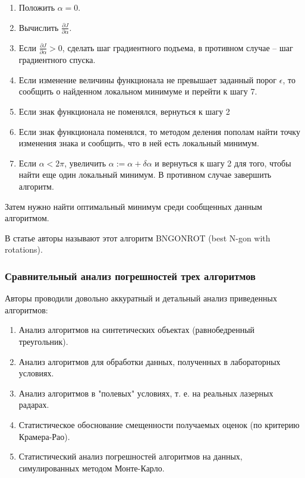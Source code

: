 \documentclass[a4paper, 12pt, titlepage]{article}
\theoremstyle{definition}
\theoremstyle{plain}
\theoremstyle{plain}
\begin{document}
\begin{enumerate}
 \item Положить $\alpha = 0$.
 \item Вычислить $\frac{\partial J}{\partial \alpha}$.
 \item Если $\frac{\partial J}{\partial \alpha} > 0$, сделать шаг градиентного 
подъема, в противном случае -- шаг градиентного спуска.
 \item Если изменение величины функционала не превышает заданный порог
$\epsilon$, то сообщить о найденном локальном минимуме и перейти к шагу 7.
 \item Если знак функционала не поменялся, вернуться к шагу 2
 \item Если знак функционала поменялся, то методом деления пополам найти точку 
изменения знака и сообщить, что в ней есть локальный минимум.
 \item Если $\alpha < 2 \pi$, увеличить $\alpha := \alpha + \delta \alpha$ и
вернуться к шагу 2 для того, чтобы найти еще один локальный минимум. В противном
случае завершить алгоритм.
\end{enumerate}

Затем нужно найти оптимальный минимум среди сообщенных данным алгоритмом.

В статье авторы называют этот алгоритм BNGONROT (best N-gon with rotations).

\subsubsection{Сравнительный анализ погрешностей трех алгоритмов}
\label{sec:history/LeleKW92/analysis}

Авторы проводили довольно аккуратный и детальный анализ приведенных алгоритмов:

\begin{enumerate}
 \item Анализ алгоритмов на синтетических объектах (равнобедренный треугольник).
 \item Анализ алгоритмов для обработки данных, полученных в лабораторных
условиях.
 \item Анализ алгоритмов в "полевых" условиях, т. е. на реальных лазерных
радарах.
 \item Статистическое обоснование смещенности получаемых оценок (по критерию
Крамера-Рао).
 \item Статистический анализ погрешностей алгоритмов на данных, симулированных
методом Монте-Карло.
\end{enumerate}
\end{document}
